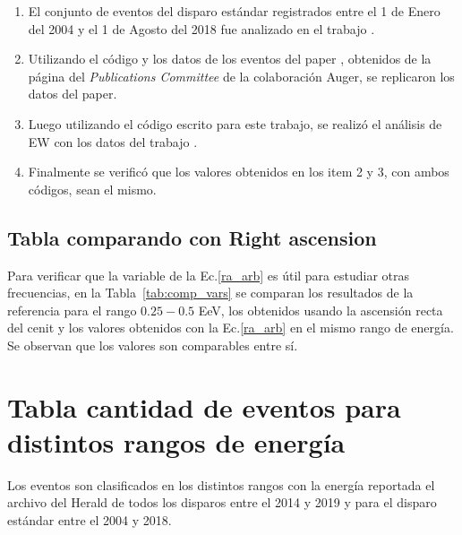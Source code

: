 \begin{enumerate}[noitemsep]
    \item El conjunto de eventos del disparo estándar registrados entre el 1 de Enero del 2004 y el 1 de Agosto del 2018 fue analizado en el trabajo \cite{Aab_2020}.
    \item Utilizando el código y los datos de los eventos del paper \cite{Aab_2020}, obtenidos de la página del \emph{Publications Committee} de la colaboración Auger, se replicaron los datos del paper. 
    \item Luego utilizando el código escrito para este trabajo, se realizó el análisis de EW con los datos del trabajo \cite{Aab_2020}. 
    \item Finalmente se verificó que los valores obtenidos en los item 2 y 3, con  ambos códigos, sean el mismo.
\end{enumerate}

\subsection*{Tabla comparando con Right ascension}

Para verificar que la variable de la Ec.\ref{ra_arb} es útil para estudiar otras frecuencias, en la Tabla~\ref{tab:comp_vars} se comparan los resultados de la referencia para el rango $0.25-0.5$ EeV, los obtenidos usando la ascensión recta del cenit y los valores obtenidos con la Ec.\ref{ra_arb} en el mismo rango de energía. Se observan que los valores son comparables entre sí.


\section*{Tabla cantidad de eventos para distintos rangos de energía}

Los eventos son clasificados en los distintos rangos con la energía reportada el archivo del Herald de todos los disparos  entre el 2014 y 2019 y para el disparo estándar entre el 2004 y 2018.

